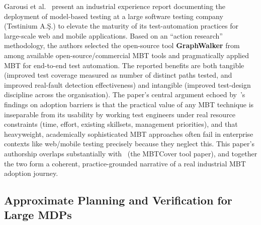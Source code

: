 Garousi et al.~\cite{garousi2021mbt_practice} present an industrial
experience report documenting the deployment of model-based testing at a
large software testing company (Testinium A.\c{S}.) to elevate the
maturity of its test-automation practices for large-scale web and mobile
applications.  Based on an ``action research'' methodology, the authors
selected the open-source tool \textbf{GraphWalker} from among available
open-source/commercial MBT tools and pragmatically applied MBT for
end-to-end test automation.  The reported benefits are both tangible
(improved test coverage measured as number of distinct paths tested, and
improved real-fault detection effectiveness) and intangible (improved
test-design discipline across the organisation).  The paper's central
argument echoed by~\cite{alegroth2022practitioners}'s findings on
adoption barriers is that the practical value of any MBT technique is
inseparable from its usability by working test engineers under real
resource constraints (time, effort, existing skillsets, management
priorities), and that heavyweight, academically sophisticated MBT
approaches often fail in enterprise contexts like web/mobile testing
precisely because they neglect this.  This paper's authorship overlaps
substantially with~\cite{garousi2024coverage} (the MBTCover tool paper),
and together the two form a coherent, practice-grounded narrative of a
real industrial MBT adoption journey.

\subsection{Approximate Planning and Verification for Large MDPs}
\label{sec:lr_lassaigne}

